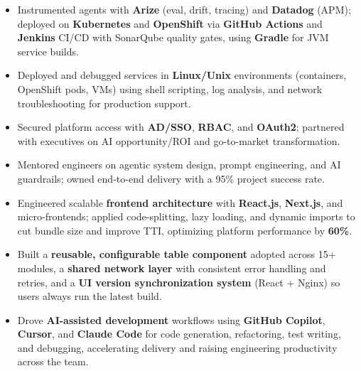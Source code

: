 \documentclass[a4paper]{article}
\begin{document}
\begin{itemize}
\item {Instrumented agents with \textbf{Arize} (eval, drift, tracing) and \textbf{Datadog} (APM); deployed on \textbf{Kubernetes} and \textbf{OpenShift} via \textbf{GitHub Actions} and \textbf{Jenkins} CI/CD with SonarQube quality gates, using \textbf{Gradle} for JVM service builds.}
\item {Deployed and debugged services in \textbf{Linux/Unix} environments (containers, OpenShift pods, VMs) using shell scripting, log analysis, and network troubleshooting for production support.}
\item {Secured platform access with \textbf{AD/SSO}, \textbf{RBAC}, and \textbf{OAuth2}; partnered with executives on AI opportunity/ROI and go-to-market transformation.}
\item {Mentored engineers on agentic system design, prompt engineering, and AI guardrails; owned end-to-end delivery with a 95\% project success rate.}
\item {Engineered scalable \textbf{frontend architecture} with \textbf{React.js}, \textbf{Next.js}, and micro-frontends; applied code-splitting, lazy loading, and dynamic imports to cut bundle size and improve TTI, optimizing platform performance by \textbf{60\%}.}
\item {Built a \textbf{reusable, configurable table component} adopted across 15+ modules, a \textbf{shared network layer} with consistent error handling and retries, and a \textbf{UI version synchronization system} (React + Nginx) so users always run the latest build.}
\item {Drove \textbf{AI-assisted development} workflows using \textbf{GitHub Copilot}, \textbf{Cursor}, and \textbf{Claude Code} for code generation, refactoring, test writing, and debugging, accelerating delivery and raising engineering productivity across the team.}
\end{itemize}
\end{document}
